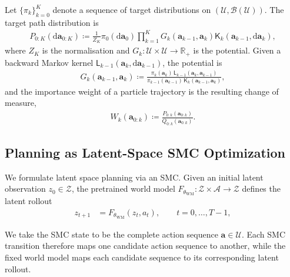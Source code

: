 Let $\{\pi_k\}_{k=0}^{K}$ denote a sequence of target distributions on
$(\mathcal{U},\mathcal{B}(\mathcal{U}))$. The target path distribution is
\begin{align}
P_{0:K}(\mathrm{d}\mathbf{a}_{0:K})
\coloneqq
\frac{1}{Z_K}
\pi_0(\mathrm{d}\mathbf{a}_0)
\prod_{k=1}^{K}
G_k(\mathbf{a}_{k-1},\mathbf{a}_k)
\mathsf{K}_k(\mathbf{a}_{k-1},\mathrm{d}\mathbf{a}_k),
\end{align}
where $Z_K$ is the normalisation and
$G_k:\mathcal{U}\times\mathcal{U}\rightarrow\mathbb{R}_{+}$ is the potential. Given a
backward Markov kernel $\mathsf{L}_{k-1}(\mathbf{a}_k,\mathrm{d}\mathbf{a}_{k-1})$, the
potential is
\begin{align}\label{eq:potential_def}
G_k(\mathbf{a}_{k-1},\mathbf{a}_k)
\coloneqq
\frac{\pi_k(\mathbf{a}_k)\,\mathsf{L}_{k-1}(\mathbf{a}_k,\mathbf{a}_{k-1})}
     {\pi_{k-1}(\mathbf{a}_{k-1})\,\mathsf{K}_k(\mathbf{a}_{k-1},\mathbf{a}_k)},
\end{align}
and the importance weight of a particle trajectory is the resulting change of measure,
\begin{align}\label{eq:smc_weights}
W_k(\mathbf{a}_{0:k}) \coloneqq \frac{P_{0:k}(\mathbf{a}_{0:k})}{Q_{0:k}(\mathbf{a}_{0:k})} .
\end{align}

\subsection{Planning as Latent-Space SMC Optimization}
\label{sec:latent_smc_planning}

We formulate latent space planning via an SMC. Given an initial latent observation $z_0\in\mathcal{Z}$, the pretrained world model
$F_{\theta_{\mathrm{WM}}}:\mathcal{Z}\times\mathcal{A}\rightarrow\mathcal{Z}$
defines the latent rollout
\begin{align}
z_{t+1}
&=
F_{\theta_{\mathrm{WM}}}(z_t,a_t),
\qquad
t=0,\ldots,T-1,
\end{align}

We take the SMC state to be the complete action sequence $\mathbf{a}\in\mathcal{U}$. Each SMC transition therefore maps one candidate action sequence to another, while the fixed world model maps each candidate sequence to its corresponding latent rollout.

